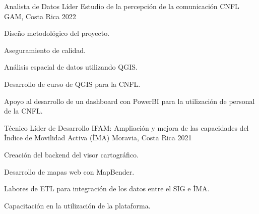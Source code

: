 \begin{cventries}
{\begin{cvitems}
  \end{cvitems}
}
\cventry
{Analista de Datos Líder} %
{Estudio de la percepción de la comunicación CNFL} %
{GAM, Costa Rica} %
{2022} %
{
  \begin{cvitems} %
    \item Diseño metodológico del proyecto.
    \item Aseguramiento de calidad.
    \item Análisis espacial de datos utilizando QGIS.
    \item Desarrollo de curso de QGIS para la CNFL.
    \item Apoyo al desarrollo de un dashboard con PowerBI para la utilización de
    personal de la CNFL.
  \end{cvitems}
}
\cventry
{Técnico Líder de Desarrollo} %
{IFAM: Ampliación y mejora de las capacidades del Índice de Movilidad Activa (ÍMA)} %
{Moravia, Costa Rica} %
{2021} %
{
  \begin{cvitems} %
    \item Creación del backend del visor cartográfico.
    \item Desarrollo de mapas web con MapBender.
    \item Labores de ETL para integración de los datos entre el SIG e ÍMA.
    \item Capacitación en la utilización de la plataforma.
  \end{cvitems}
}
\end{cventries}